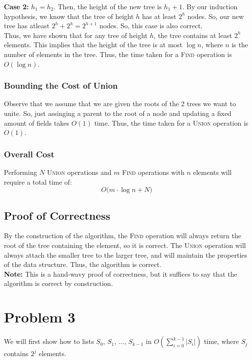 \documentclass[a4paper]{article}
\begin{document}
\noindent \textbf{Case 2:} $h_1 = h_2$. Then, the height of the new tree is $h_1 + 1$. By our induction hypothesis, we know that the tree of height $h$ has at least $2^h$ nodes. So, our new tree has atleast $2^h+ 2^h = 2^{h + 1}$ nodes. So, this case is also correct. \\

\noindent Thus, we have shown that for any tree of height $h$, the tree contains at least $2^h$ elements. This implies that the height of the tree is at most $\log n$, where $n$ is the number of elements in the tree. Thus, the time taken for a \textsc{Find} operation is $O(\log n)$.

\subsubsection*{Bounding the Cost of Union}
Observe that we assume that we are given the roots of the 2 trees we want to unite. So, just assinging a parent to the root of a node and updating a fixed amount of fields takes $O(1)$ time. Thus, the time taken for a \textsc{Union} operation is $O(1)$.


\subsubsection*{Overall Cost}
Performing $N$ \textsc{Union} operations and $m$ \textsc{Find} operations with $n$ elements will require a total time of:
\[
O\bigl(m \cdot \log n + N\bigr)
\]


\vspace{2mm}
\subsection*{Proof of Correctness}
By the construction of the algorithm, the \textsc{Find} operation will always return the root of the tree containing the element, so it is correct. The \textsc{Union} operation will always attach the smaller tree to the larger tree, and will maintain the properties of the data structure. Thus, the algorithm is correct. \\

\noindent\textbf{Note:} This is a hand-wavy proof of correctness, but it suffices to say that the algorithm is correct by construction.


\newpage
\section*{Problem 3}
We will first show how to lists $S_0$, $S_1$, ..., $S_{k-1}$ in $O(\sum_{i=0}^{k-1}|S_i|)$ time, where $S_j$ contains $2^j$ elements.
\end{document}
